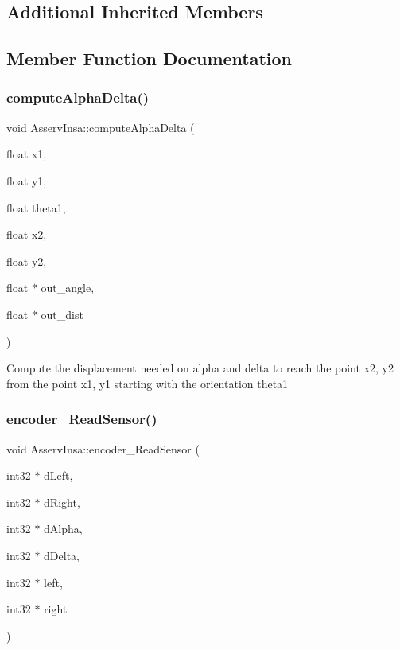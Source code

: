 \subsection*{Additional Inherited Members}


\subsection{Member Function Documentation}
\mbox{\label{classAsservInsa_af139b79d3547a044dbf921e5984bc3cd}} 
\subsubsection{\texorpdfstring{compute\+Alpha\+Delta()}{computeAlphaDelta()}}
{\footnotesize\ttfamily void Asserv\+Insa\+::compute\+Alpha\+Delta (\begin{DoxyParamCaption}\item[{float}]{x1,  }\item[{float}]{y1,  }\item[{float}]{theta1,  }\item[{float}]{x2,  }\item[{float}]{y2,  }\item[{float $\ast$}]{out\+\_\+angle,  }\item[{float $\ast$}]{out\+\_\+dist }\end{DoxyParamCaption})}

Compute the displacement needed on alpha and delta to reach the point x2, y2 from the point x1, y1 starting with the orientation theta1 \mbox{\label{classAsservInsa_a76cc56c8240ee5f95dd15f4d3097f9a7}} 
\subsubsection{\texorpdfstring{encoder\+\_\+\+Read\+Sensor()}{encoder\_ReadSensor()}}
{\footnotesize\ttfamily void Asserv\+Insa\+::encoder\+\_\+\+Read\+Sensor (\begin{DoxyParamCaption}\item[{int32 $\ast$}]{d\+Left,  }\item[{int32 $\ast$}]{d\+Right,  }\item[{int32 $\ast$}]{d\+Alpha,  }\item[{int32 $\ast$}]{d\+Delta,  }\item[{int32 $\ast$}]{left,  }\item[{int32 $\ast$}]{right }\end{DoxyParamCaption})}

